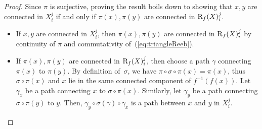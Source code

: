 \begin{proof}
Since $\pi$ is surjective, proving the result boils down to
showing that $x,y$ are connected in 
$X^j_i$ if and only if $\pi(x),\pi(y)$ are connected in $\mathrm{R}_f(X)_i^j$.

\begin{itemize}
\item If $x,y$ are connected in $X^j_i$,
then $\pi(x),\pi(y)$ are connected in $\mathrm{R}_f(X)^j_i$
by continuity of $\pi$ and
commutativity of~(\ref{eq:triangleReeb}).
%
\item If $\pi(x),\pi(y)$ are connected in $\mathrm{R}_f(X)^j_i$,
then choose a path $\gamma$ connecting $\pi(x)$ to $\pi(y)$. By definition of~$\sigma$, we have
$\pi\circ\sigma\circ\pi(x)=\pi(x)$, thus $\sigma\circ\pi(x)$ and
$x$ lie in the same connected component of $f^{-1}(f(x))$.  Let $\gamma_x$ be a path
connecting $x$ to $\sigma\circ\pi(x)$. Similarly, let $\gamma_y$
be a path connecting $\sigma\circ\pi(y)$ to $y$. Then,
$\gamma_y\circ\sigma(\gamma)\circ\gamma_x$ is a path between $x$ and $y$ in $X^j_i$.
\end{itemize}

\end{proof}

